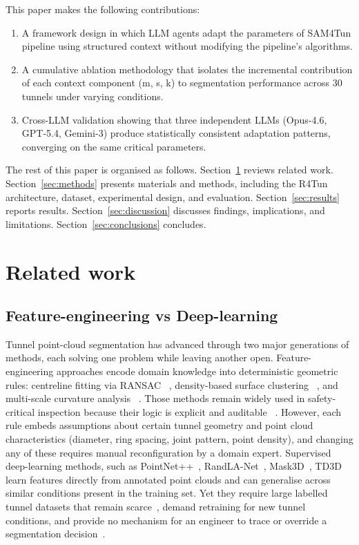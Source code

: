 \documentclass[a4paper,fleqn]{cas-dc}
\begin{document}
This paper makes the following contributions:
\begin{enumerate}
\item A framework design in which LLM agents adapt the parameters of SAM4Tun pipeline using structured context without modifying the pipeline’s algorithms.
\item A cumulative ablation methodology that isolates the incremental contribution of each context component (m, s, k) to segmentation performance across 30 tunnels under varying conditions.
\item Cross-LLM validation showing that three independent LLMs (Opus-4.6, GPT-5.4, Gemini-3) produce statistically consistent adaptation patterns, converging on the same critical parameters.
\end{enumerate}

The rest of this paper is organised as follows. Section~\ref{sec:related} reviews related work. Section~\ref{sec:methods} presents materials and methods, including the R4Tun architecture, dataset, experimental design, and evaluation. Section~\ref{sec:results} reports results. Section~\ref{sec:discussion} discusses findings, implications, and limitations. Section~\ref{sec:conclusions} concludes.

\section{Related work}\label{sec:related}



\subsection{Feature-engineering vs Deep-learning}

Tunnel point-cloud segmentation has advanced through two major generations of methods, each solving one problem while leaving another open. Feature-engineering approaches encode domain knowledge into deterministic geometric rules: centreline fitting via RANSAC ~\cite{fischler1981ransac}, density-based surface clustering ~\cite{ester1996dbscan}, and multi-scale curvature analysis ~\cite{pauly2002}. Those methods remain widely used in safety-critical inspection because their logic is explicit and auditable ~\cite{weidner2024generalized}. However, each rule embeds assumptions about certain tunnel geometry and point cloud characteristics (diameter, ring spacing, joint pattern, point density), and changing any of these requires manual reconfiguration by a domain expert. Supervised deep-learning methods, such as PointNet++~\cite{qi2017pointnet}, RandLA-Net~\cite{hu2020randla}, Mask3D~\cite{schult2023mask3d}, TD3D~\cite{kolodiazhnyi2024td3d} learn features directly from annotated point clouds and can generalise across similar conditions present in the training set. Yet they require large labelled tunnel datasets that remain scarce~\cite{su2024review}, demand retraining for new tunnel conditions, and provide no mechanism for an engineer to trace or override a segmentation decision~\cite{cha2024deep}.
\end{document}
